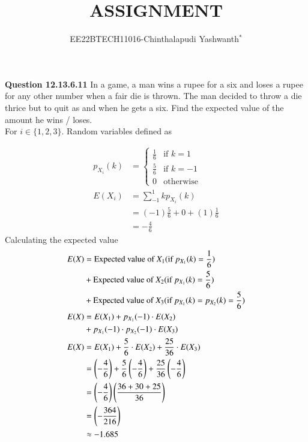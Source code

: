 \documentclass[journal,12pt,twocolumn]{IEEEtran}
\theoremstyle{remark}
\begin{document}

\vspace{3cm}

\title{ASSIGNMENT}
\author{EE22BTECH11016-Chinthalapudi Yashwanth$^{*}$%
}
\maketitle
\newpage
\bigskip
\renewcommand{\thefigure}{\theenumi}
\renewcommand{\thetable}{\theenumi}

\textbf{Question 12.13.6.11}
In a game, a man wins a rupee for a six and loses a rupee for any other number
when a fair die is thrown. The man decided to throw a die thrice but to quit as
and when he gets a six. Find the expected value of the amount he wins / loses.\\
\solution
For $i \in \{1,2,3\}$. Random variables defined as
\begin{table}[!ht]
	
\end{table}
\begin{align}
p_{X_i}(k)&=\begin{cases}
            \frac{1}{6} & \text{if } k=1\\
            \frac{5}{6} & \text{if } k=-1\\
            0 & \text{otherwise}
        \end{cases}\\
E(X_i)&=\sum_{-1}^{1}kp_{X_i}(k)\\
&=(-1)\frac{5}{6}+0+(1)\frac{1}{6}\\
&=-\frac{4}{6}
\end{align}
Calculating the expected value
\begin{align}
E(X)&=\text{Expected value of } X_1 (\text{if } p_{X_1}(k)=\frac{1}{6}) \notag\\
    &+\text{Expected value of } X_2 (\text{if } p_{X_1}(k)=\frac{5}{6}) \notag\\
    &+\text{Expected value of } X_3 (\text{if } p_{X_1}(k)=p_{X_2}(k)=\frac{5}{6}) \\
E(X)&=E(X_1) + p_{X_{1}} (-1)\cdot E(X_2) \notag\\
 &+ p_{X_{1}} (-1)\cdot p_{X_{2}} (-1)\cdot E(X_3)\\
E(X) &= E(X_1) + \frac{5}{6} \cdot E(X_2) + \frac{25}{36} \cdot E(X_3)\\
       &= \left(-\frac{4}{6}\right) + \frac{5}{6} \left(-\frac{4}{6}\right)
       + \frac{25}{36} \left(-\frac{4}{6}\right)\\
       &= \left(-\frac{4}{6}\right) \left(\frac{36 + 30 + 25}{36}\right)\\
       &= \left(-\frac{364}{216}\right)\\
       &\approx -1.685
\end{align}
\end{document}
